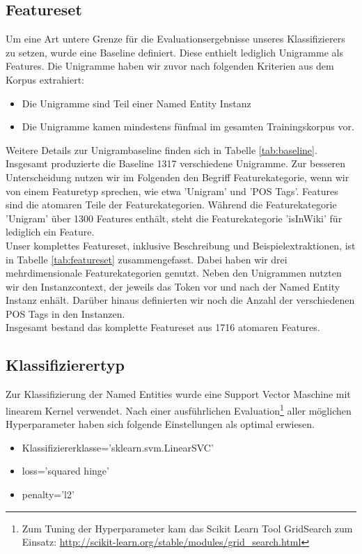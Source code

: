 \documentclass[bibliography=totoc]{scrartcl}
\begin{document}
	\subsection{Featureset}
	Um eine Art untere Grenze für die Evaluationsergebnisse unseres Klassifizierers zu setzen, wurde eine Baseline definiert. Diese enthielt lediglich Unigramme als Features. Die Unigramme haben wir zuvor nach folgenden Kriterien aus dem Korpus extrahiert:
	\begin{itemize}
		\item Die Unigramme sind Teil einer Named Entity Instanz
		\item Die Unigramme kamen mindestens fünfmal im gesamten Trainingskorpus vor.
	\end{itemize}
	Weitere Details zur Unigrambaseline finden sich in Tabelle \ref{tab:baseline}. Insgesamt produzierte die Baseline 1317 verschiedene Unigramme. Zur besseren Unterscheidung nutzen wir im Folgenden den Begriff Featurekategorie, wenn wir von einem Featuretyp sprechen, wie etwa 'Unigram' und 'POS Tags'. Features sind die atomaren Teile der Featurekategorien. Während die Featurekategorie 'Unigram' über 1300 Features enthält, steht die Featurekategorie 'isInWiki' für lediglich ein Feature.\\
	
	Unser komplettes Featureset, inklusive Beschreibung und Beispielextraktionen, ist in Tabelle \ref{tab:featureset} zusammengefasst. Dabei haben wir drei mehrdimensionale Featurekategorien genutzt. Neben den Unigrammen nutzten wir den Instanzcontext, der jeweils das Token vor und nach der Named Entity Instanz enhält. Darüber hinaus definierten wir noch die Anzahl der verschiedenen POS Tags in den Instanzen.\\
	Insgesamt bestand das komplette Featureset aus 1716 atomaren Features.  
	\subsection{Klassifizierertyp}
	Zur Klassifizierung der Named Entities wurde eine Support Vector Maschine mit
	linearem Kernel verwendet. Nach einer ausführlichen Evaluation\footnote{Zum Tuning der Hyperparameter  kam das Scikit Learn Tool GridSearch zum Einsatz: \url{http://scikit-learn.org/stable/modules/grid_search.html}} aller möglichen Hyperparameter haben sich folgende Einstellungen als optimal erwiesen.
	\begin{itemize}
		\item Klassifiziererklasse='sklearn.svm.LinearSVC'
		\item loss=’squared hinge’
		\item penalty=’l2’
	\end{itemize}
\end{document}
